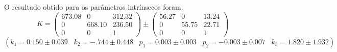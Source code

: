 \documentclass[conference]{IEEEtran}
\begin{document}
O resultado obtido para os parâmetros intrínsecos foram:
$$
K = \begin{pmatrix} 
673.08 & 0 & 312.32 \\
0 & 668.10 & 236.50\\
0 & 0 & 1
\end{pmatrix}
\pm
\begin{pmatrix} 
56.27 & 0 & 13.24 \\
0 & 55.75 & 22.71\\
0 & 0 & 1
\end{pmatrix}
$$
\((k_1=0.150\pm0.039 \hspace{10pt} k_2=-.744\pm0.448 \hspace{10pt} p_1=0.003\pm0.003 \hspace{10pt} p_2=-0.003\pm0.007 \hspace{10pt} k_3=1.820\pm1.932)\)
\end{document}
